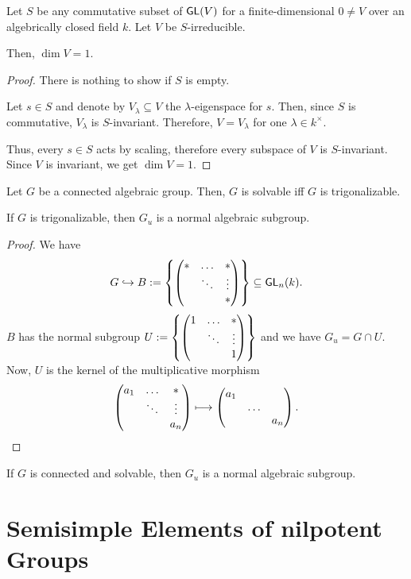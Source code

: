 \begin{lemma}
	Let $S$ be any commutative subset of $\textsf{GL}(V)$ for a finite-dimensional $0\neq V$ over an algebrically closed field $k$. Let $V$ be $S$-irreducible.
	
	Then, $\dim V = 1$.
\end{lemma}
\begin{proof}
	There is nothing to show if $S$ is empty.
	
	Let $s \in S$ and denote by $V_\lambda \subseteq V $ the $\lambda$-eigenspace for $s$. Then, since $S$ is commutative, $V_\lambda$ is $S$-invariant. Therefore, $V = V_\lambda$ for one $\lambda \in k^\times$.
	
	Thus, every $s \in S$ acts by scaling, therefore every subspace of $V$ is $S$-invariant. Since $V$ is invariant, we get $\dim V = 1$.
\end{proof}

\begin{corollary}
	Let $G$ be a connected algebraic group. Then, $G$ is solvable iff $G$ is trigonalizable.
\end{corollary}

\begin{proposition}
	If $G$ is trigonalizable, then $G_u$ is a normal algebraic subgroup.
\end{proposition}
\begin{proof}
	We have
	\[ G \overset{}{\hookrightarrow} B:= \left\lbrace
\left(\begin{matrix} * & \ldots & *\\  & \ddots & \vdots \\ & & * \end{matrix}\right)	
\right\rbrace  \subseteq \textsf{GL}_n(k). \]
$B$ has the normal subgroup $U := \left\lbrace
	\left(\begin{matrix} 1 & \ldots & *\\  & \ddots & \vdots \\ & & 1 \end{matrix}\right)	
\right\rbrace$ and we have $G_u = G \cap U$. Now, $U$ is the kernel of the multiplicative morphism
\[ 
\left(\begin{matrix} a_1 & \ldots & * \\ & \ddots & \vdots \\ & & a_n \end{matrix}\right) \longmapsto \left(\begin{matrix} a_1 &  &  \\ & \ldots &  \\ & & a_n \end{matrix}\right).
\]
\end{proof}
\begin{corollary}
	If $G$ is connected and solvable, then $G_u$ is a normal algebraic subgroup.
\end{corollary}

\newpage
\section{Semisimple Elements of nilpotent Groups}

